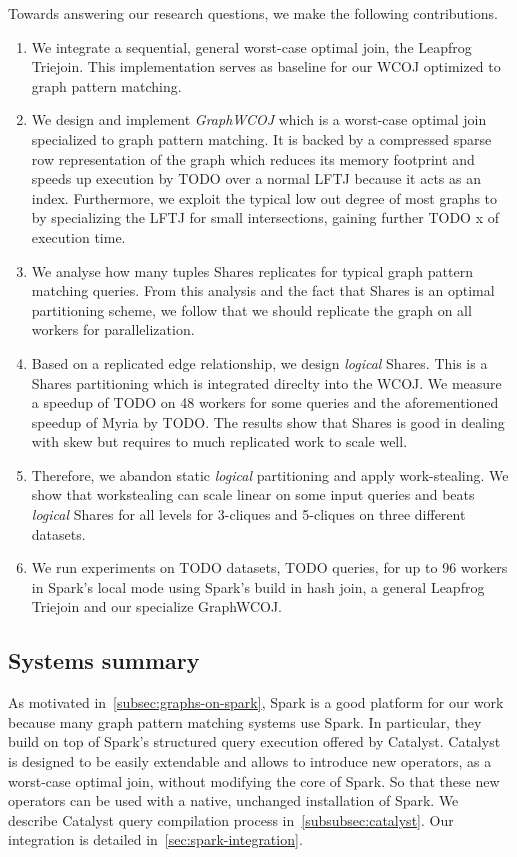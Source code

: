 Towards answering our research questions, we make the following contributions.
\begin{enumerate}
    \item We integrate a sequential, general worst-case optimal join, the Leapfrog Triejoin.
      This implementation serves as baseline for our \textsc{WCOJ} optimized to graph pattern matching.
    \item We design and implement \textit{GraphWCOJ} which is a worst-case optimal join specialized to graph pattern matching.
       It is backed by a compressed sparse row representation of the graph which reduces its memory footprint and speeds up execution
       by TODO over a normal \textsc{LFTJ} because it acts as an index. %
       Furthermore, we exploit the typical low out degree of most graphs to by specializing the \textsc{LFTJ} for small intersections,
       gaining further TODO x of execution time. %
    \item We analyse how many tuples Shares replicates for typical graph pattern matching queries.
      From this analysis and the fact that Shares is an optimal partitioning scheme, we follow that we should replicate the graph
      on all workers for parallelization.
    \item Based on a replicated edge relationship, we design \textit{logical} Shares.
      This is a Shares partitioning which is integrated direclty into the \textsc{WCOJ}.
      We measure a speedup of TODO on 48 workers for some queries and the aforementioned speedup of Myria by TODO.
      The results show that Shares is good in dealing with skew but requires to much replicated work to scale well.
    \item Therefore, we abandon static \textit{logical} partitioning and apply work-stealing.
       We show that workstealing can scale linear on some input queries and beats \textit{logical} Shares for
       all levels for 3-cliques and 5-cliques on three different datasets.
    \item We run experiments on TODO datasets, TODO queries, for up to 96 workers in Spark's local mode using Spark's build in hash join,
       a general Leapfrog Triejoin and our specialize GraphWCOJ.
\end{enumerate}

\subsection{Systems summary} \label{subsec:system-summary}
As motivated in~\cref{subsec:graphs-on-spark}, Spark is a good platform for our work because many graph pattern matching systems use
Spark.
In particular, they build on top of Spark's structured query execution offered by Catalyst.
Catalyst is designed to be easily extendable and allows to introduce new operators, as a worst-case optimal join,
without modifying the core of Spark.
So that these new operators can be used with a native, unchanged installation of Spark.
We describe Catalyst query compilation process in~\cref{subsubsec:catalyst}.
Our integration is detailed in~\cref{sec:spark-integration}.

